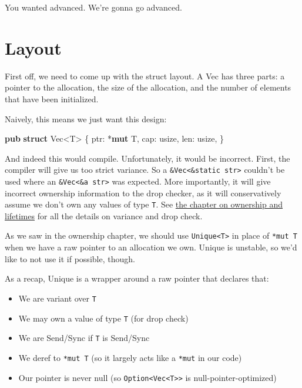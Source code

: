 \documentclass[a4paper,]{book}
\newenvironment{Shaded}{\begin{snugshade}}{\end{snugshade}}
\newcommand{\KeywordTok}[1]{\textcolor[rgb]{0.13,0.29,0.53}{\textbf{{#1}}}}
\newcommand{\DataTypeTok}[1]{\textcolor[rgb]{0.13,0.29,0.53}{{#1}}}
\newcommand{\NormalTok}[1]{{#1}}
\providecommand{\tightlist}{%
  \setlength{\itemsep}{0pt}\setlength{\parskip}{0pt}}
\begin{document}
You wanted advanced. We're gonna go advanced.

\section{Layout}\label{sec--vec-layout}

First off, we need to come up with the struct layout. A Vec has three
parts: a pointer to the allocation, the size of the allocation, and the
number of elements that have been initialized.

Naively, this means we just want this design:

\begin{Shaded}
\begin{Highlighting}[]
\KeywordTok{pub} \KeywordTok{struct} \DataTypeTok{Vec}\NormalTok{<T> \{}
    \NormalTok{ptr: *}\KeywordTok{mut} \NormalTok{T,}
    \NormalTok{cap: }\DataTypeTok{usize}\NormalTok{,}
    \NormalTok{len: }\DataTypeTok{usize}\NormalTok{,}
\NormalTok{\}}
\end{Highlighting}
\end{Shaded}

And indeed this would compile. Unfortunately, it would be incorrect.
First, the compiler will give us too strict variance. So a
\texttt{\&Vec\textless{}\&\textquotesingle{}static\ str\textgreater{}}
couldn't be used where an
\texttt{\&Vec\textless{}\&\textquotesingle{}a\ str\textgreater{}} was
expected. More importantly, it will give incorrect ownership information
to the drop checker, as it will conservatively assume we don't own any
values of type \texttt{T}. See \protect\hyperlink{sec--ownership}{the
chapter on ownership and lifetimes} for all the details on variance and
drop check.

As we saw in the ownership chapter, we should use
\texttt{Unique\textless{}T\textgreater{}} in place of \texttt{*mut\ T}
when we have a raw pointer to an allocation we own. Unique is unstable,
so we'd like to not use it if possible, though.

As a recap, Unique is a wrapper around a raw pointer that declares that:

\begin{itemize}
\tightlist
\item
  We are variant over \texttt{T}
\item
  We may own a value of type \texttt{T} (for drop check)
\item
  We are Send/Sync if \texttt{T} is Send/Sync
\item
  We deref to \texttt{*mut\ T} (so it largely acts like a \texttt{*mut}
  in our code)
\item
  Our pointer is never null (so
  \texttt{Option\textless{}Vec\textless{}T\textgreater{}\textgreater{}}
  is null-pointer-optimized)
\end{itemize}
\end{document}
